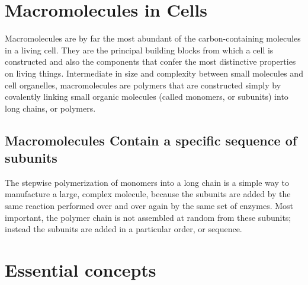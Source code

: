 \section{Macromolecules in Cells}

Macromolecules are by far the most abundant
of the carbon-containing molecules in a living cell. They
are the principal building blocks from which a cell is constructed and
also the components that confer the most distinctive properties on living things. 
Intermediate in size and complexity between small molecules
and cell organelles, macromolecules are polymers that are constructed
simply by covalently linking small organic molecules (called monomers,
or subunits) into long chains, or polymers.

\subsection{Macromolecules Contain a specific sequence of subunits}

The stepwise polymerization of monomers into a long chain is a simple
way to manufacture a large, complex molecule, because the subunits are
added by the same reaction performed over and over again by the same
set of enzymes. Most important, the polymer chain is
not assembled at random from these subunits; instead the subunits are
added in a particular order, or sequence.

\section{Essential concepts}

